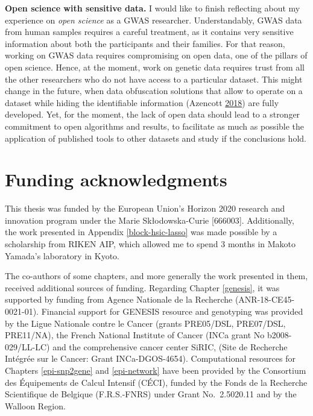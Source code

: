 \documentclass[
  11pt,
]{env/yjiao}
\begin{document}
\textbf{Open science with sensitive data.} I would like to finish reflecting about my experience on \emph{open science} as a GWAS researcher. Understandably, GWAS data from human samples requires a careful treatment, as it contains very sensitive information about both the participants and their families. For that reason, working on GWAS data requires compromising on open data, one of the pillars of open science. Hence, at the moment, work on genetic data requires trust from all the other researchers who do not have access to a particular dataset. This might change in the future, when data obfuscation solutions that allow to operate on a dataset while hiding the identifiable information (Azencott \protect\hyperlink{ref-azencott_machine_2018}{2018}) are fully developed. Yet, for the moment, the lack of open data should lead to a stronger commitment to open algorithms and results, to facilitate as much as possible the application of published tools to other datasets and study if the conclusions hold.

\hypertarget{funding-acknowledgments}{%
\chapter*{Funding acknowledgments}\label{funding-acknowledgments}}

This thesis was funded by the European Union's Horizon 2020 research and innovation program under the Marie Skłodowska-Curie {[}666003{]}. Additionally, the work presented in Appendix \ref{block-hsic-lasso} was made possible by a scholarship from RIKEN AIP, which allowed me to spend 3 months in Makoto Yamada's laboratory in Kyoto.

The co-authors of some chapters, and more generally the work presented in them, received additional sources of funding. Regarding Chapter \ref{genesis}, it was supported by funding from Agence Nationale de la Recherche (ANR-18-CE45-0021-01). Financial support for GENESIS resource and genotyping was provided by the Ligue Nationale contre le Cancer (grants PRE05/DSL, PRE07/DSL, PRE11/NA), the French National Institute of Cancer (INCa grant No b2008-029/LL-LC) and the comprehensive cancer center SiRIC, (Site de Recherche Intégrée sur le Cancer: Grant INCa-DGOS-4654). Computational resources for Chapters \ref{epi-snp2gene} and \ref{epi-network} have been provided by the Consortium des Équipements de Calcul Intensif (CÉCI), funded by the Fonds de la Recherche Scientifique de Belgique (F.R.S.-FNRS) under Grant No.~2.5020.11 and by the Walloon Region.
\end{document}
